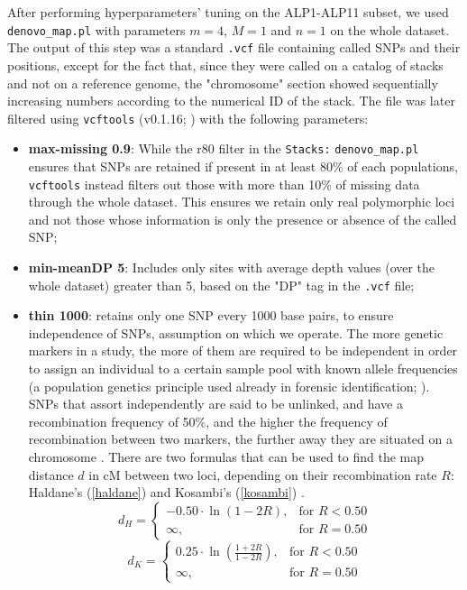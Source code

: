 \documentclass[a4paper, 12pt]{report}
\begin{document}
After performing hyperparameters' tuning on the ALP1-ALP11 subset, we used \texttt{denovo\_map.pl} with parameters $m = 4$, $M = 1$ and $n = 1$ on the whole dataset. The output of this step was a standard \texttt{.vcf} file containing called SNPs and their positions, except for the fact that, since they were called on a catalog of stacks and not on a reference genome, the "chromosome" section showed sequentially increasing numbers according to the numerical ID of the stack. The file was later filtered using \texttt{vcftools} (v0.1.16; \cite{danecekVariantCallFormat2011}) with the following parameters:
\vspace{-1.5em}
\begin{itemize}\setlength\itemsep{-0.2em}
	\item \textbf{max-missing 0.9}: While the r80 filter in the \texttt{Stacks:} \texttt{denovo\_map.pl} ensures that SNPs are retained if present in at least 80\% of  each populations, \texttt{vcftools} instead filters out those with more than 10\% of missing data through the whole dataset. This ensures we retain only real polymorphic loci and not those whose information is only the presence or absence of the called SNP;
	\item \textbf{min-meanDP 5}: Includes only sites with average depth values (over the whole dataset) greater than 5, based on the "DP" tag in the \texttt{.vcf} file;
	\item \textbf{thin 1000}: retains only one SNP every 1000 base pairs, to ensure independence of SNPs, assumption on which we operate. The more genetic markers in a study, the more of them are required to be independent in order to assign an individual to a certain sample pool with known allele frequencies (a population genetics principle used already in forensic identification; \cite{visscherLimitsIndividualIdentification2009}). SNPs that assort independently are said to be unlinked, and have a recombination frequency of 50\%, and the higher the frequency of recombination between two markers, the further away they are situated on a chromosome \parencite{semagnPrinciplesRequirementsProspects}. There are two formulas that can be used to find the map distance $d$ in cM between two loci, depending on their recombination rate $R$: Haldane's (\ref{haldane}) and Kosambi's (\ref{kosambi}) \parencite{huehnRandomVariabilityMap2010}.
	\begin{equation}\label{haldane}
		d_H = 
		\begin{cases}
			-0.50 \cdot \ln \left( 1-2R \right), & \text{for } R < 0.50\\
			\infty, & \text{for } R = 0.50
		\end{cases}
	\end{equation}
	\begin{equation}\label{kosambi}
		d_K = 
		\begin{cases}
			0.25 \cdot \ln \left( \frac{1 + 2R}{1 - 2R} \right), & \text{for } R < 0.50\\
			\infty, & \text{for } R = 0.50
		\end{cases}
	\end{equation}
	

\end{itemize}
\end{document}
